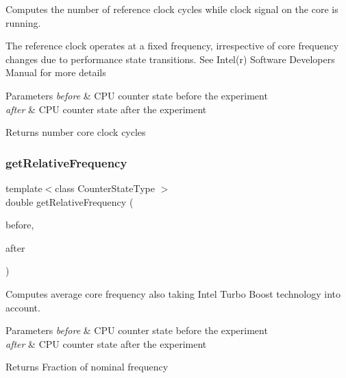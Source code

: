 Computes the number of reference clock cycles while clock signal on the core is running. 

The reference clock operates at a fixed frequency, irrespective of core frequency changes due to performance state transitions. See Intel(r) Software Developer\textquotesingle{}s Manual for more details


\begin{DoxyParams}{Parameters}
{\em before} & C\+PU counter state before the experiment \\
\hline
{\em after} & C\+PU counter state after the experiment \\
\hline
\end{DoxyParams}
\begin{DoxyReturn}{Returns}
number core clock cycles 
\end{DoxyReturn}
\mbox{\label{class_basic_counter_state_a806e72bc51f05acc4af0667ca3334242}} 
\subsubsection{\texorpdfstring{get\+Relative\+Frequency}{getRelativeFrequency}}
{\footnotesize\ttfamily template$<$class Counter\+State\+Type $>$ \\
double get\+Relative\+Frequency (\begin{DoxyParamCaption}\item[{const Counter\+State\+Type \&}]{before,  }\item[{const Counter\+State\+Type \&}]{after }\end{DoxyParamCaption})\hspace{0.3cm}{\ttfamily [friend]}}



Computes average core frequency also taking Intel Turbo Boost technology into account. 


\begin{DoxyParams}{Parameters}
{\em before} & C\+PU counter state before the experiment \\
\hline
{\em after} & C\+PU counter state after the experiment \\
\hline
\end{DoxyParams}
\begin{DoxyReturn}{Returns}
Fraction of nominal frequency 
\end{DoxyReturn}
\mbox{\label{class_basic_counter_state_a00c97b1a7d8a7125ce7fd129cddb52e8}} 
